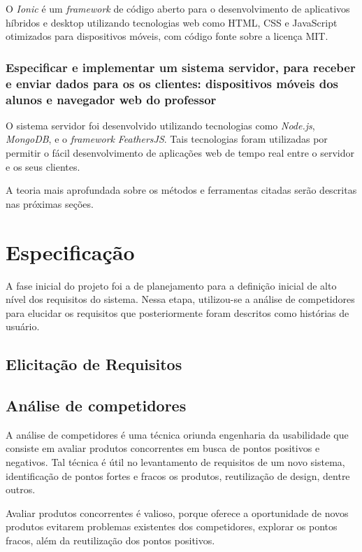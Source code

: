 O \textit{Ionic} é um \textit{framework} de código aberto para o desenvolvimento de aplicativos híbridos e desktop utilizando
tecnologias web como HTML, CSS e JavaScript otimizados para dispositivos móveis, com código fonte sobre a licença MIT.

\subsubsection{Especificar e implementar um sistema servidor, para receber e
    enviar dados para os os clientes: dispositivos móveis dos alunos e navegador
    web do professor}

O sistema servidor foi desenvolvido utilizando tecnologias como \textit{Node.js}, \textit{MongoDB}, e o \textit{framework} \textit{FeathersJS}.
Tais tecnologias foram utilizadas por permitir o fácil desenvolvimento de aplicações web de tempo real entre o servidor e os seus clientes.

A teoria mais aprofundada sobre os métodos e ferramentas citadas serão descritas nas próximas seções.

\section{Especificação}

A fase inicial do projeto foi a de planejamento para a definição inicial de alto nível dos
requisitos do sistema. Nessa etapa, utilizou-se a análise de competidores para elucidar
os requisitos que posteriormente foram descritos como histórias de usuário.

\subsection{Elicitação de Requisitos}

\subsection{Análise de competidores}

A análise de competidores é uma técnica oriunda engenharia da usabilidade
que consiste em avaliar produtos concorrentes em busca de pontos positivos e
negativos. Tal técnica é útil no levantamento de requisitos de um novo sistema,
identificação de pontos fortes e fracos os produtos, reutilização de design, dentre outros.

Avaliar produtos concorrentes é valioso, porque oferece a oportunidade de novos
produtos evitarem problemas existentes dos competidores, explorar os pontos
fracos, além da reutilização dos pontos positivos.

